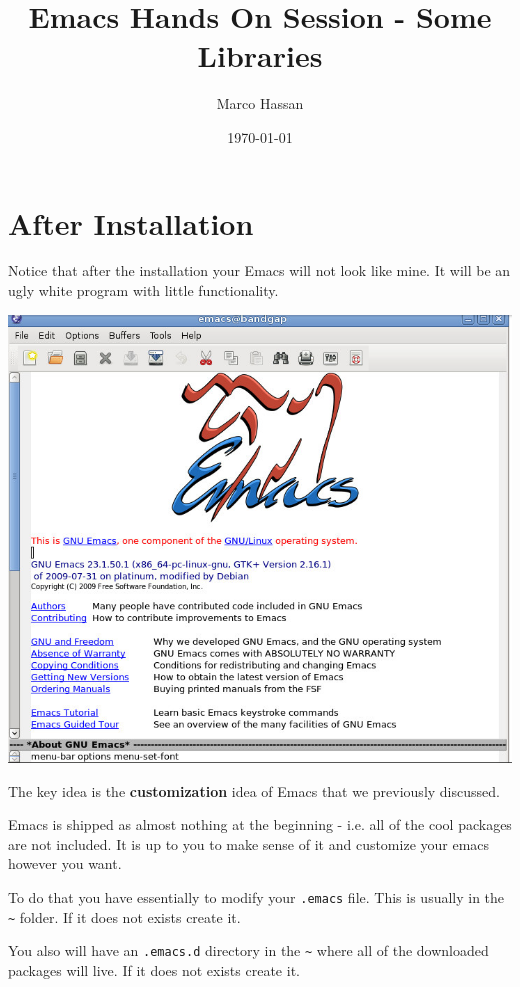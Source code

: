 \documentclass[a4paper]{article}
\author{Marco Hassan}
\date{\today}
\title{Emacs Hands On Session - Some Libraries}
\begin{document}
\maketitle
\tableofcontents

\setlength\parindent{0pt}


\section{After Installation}
\label{sec:org05d234a}

Notice that after the installation your Emacs will not look like
mine. It will be an ugly white program with little functionality.

\begin{center}
\includegraphics[width=.9\linewidth]{images/Bildschirmfoto 2021-02-17 um 10.52.06.png}
\end{center}

The key idea is the \textbf{customization} idea of Emacs that we previously
discussed.

Emacs is shipped as almost nothing at the beginning - i.e. all of
the cool packages are not included. It is up to you to make sense of
it and customize your emacs however you want.

To do that you have essentially to modify your \texttt{.emacs} file. This
is usually in the \texttt{\textasciitilde{}} folder. If it does not exists create it.

You also will have an \texttt{.emacs.d} directory in the \texttt{\textasciitilde{}} where all of the
downloaded packages will live. If it does not exists create it.
\end{document}
